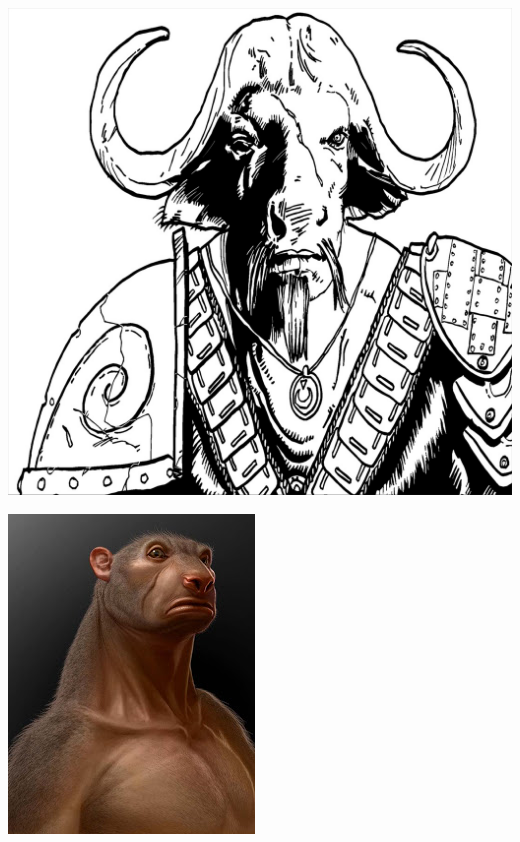 \documentclass[10pt,twoside]{article}
\begin{document}
\begin{multicols}{2}
  \includegraphics[width=\linewidth]{TCP-Armored-6}
  
  \includegraphics[width=\linewidth]{charlesliu_bearman.jpg}
  
  \end{multicols}
  
\end{document}
